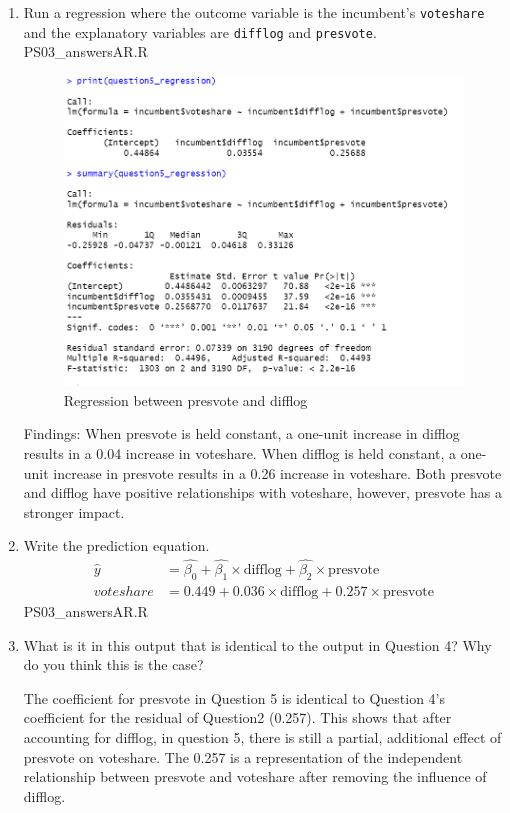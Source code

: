 \documentclass[12pt,letterpaper]{article}
\begin{document}
	\begin{enumerate}
		\item Run a regression where the outcome variable is the incumbent's \texttt{voteshare} and the explanatory variables are \texttt{difflog} and \texttt{presvote}.	
		 {PS03_answersAR.R}
		\begin{figure}[h!]\centering
			\caption{\footnotesize Regression between presvote and difflog}
			\label{}
			\includegraphics[width=.85\textwidth]{question5_regression.png}
		\end{figure}
		Findings: When presvote is held constant, a one-unit increase in difflog results in a 0.04 increase in voteshare. When difflog is held constant, a one-unit increase in presvote results in a 0.26 increase in voteshare. Both presvote and difflog have positive relationships with voteshare, however, presvote has a stronger impact.
		\item Write the prediction equation.
		\begin{align*}
			\hat{y} &= \hat{\beta_0} + \hat{\beta_1} \times  \text{difflog} + \hat{\beta_2} \times \text{presvote}\\
			voteshare &= 0.449 + 0.036 \times \text{difflog} + 0.257 \times \text{presvote}
		\end{align*}
		 {PS03_answersAR.R}
		
		\item What is it in this output that is identical to the output in Question 4? Why do you think this is the case?
	
		The coefficient for presvote in Question 5 is identical to Question 4's coefficient for the residual of Question2 (0.257). This shows that after accounting for difflog, in question 5, there is still a partial, additional effect of presvote on voteshare. The 0.257 is a representation of the independent relationship between presvote and voteshare after removing the influence of difflog.
	\end{enumerate}
\end{document}
